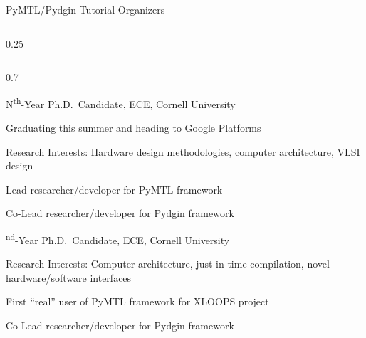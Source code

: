 \begin{frame}{PyMTL/Pydgin Tutorial Organizers}
\begin{cbxcols}

  \begin{column}{0.25\tw}


    \medskip

  \end{column}

  \begin{column}{0.7\tw}
  \cbxlistfontsize{\footnotesize}{\footnotesize}


  \vspace{0.1in}\hspace*{0.5em}%
  \begin{cbxlist}[t]

    \1 N\textsuperscript{th}-Year Ph.D.~Candidate, ECE, Cornell University

    \vspace{0.02in}
    \1 Graduating this summer and heading to Google Platforms

    \vspace{0.02in}
    \1 Research Interests: Hardware design methodologies, computer
       architecture, VLSI design

    \vspace{0.02in}
    \1 Lead researcher/developer for PyMTL framework

    \vspace{0.02in}
    \1 Co-Lead researcher/developer for Pydgin framework

  \end{cbxlist}

  \medskip

  \vspace{0.1in}\hspace*{0.5em}%
  \begin{cbxlist}[t]

    \textsuperscript{nd}-Year Ph.D.~Candidate, ECE, Cornell University

    \vspace{0.02in}
    \1 Research Interests: Computer architecture, just-in-time
          compilation, novel hardware/software interfaces

    \vspace{0.02in}
    \1 First ``real'' user of PyMTL framework for XLOOPS project

    \vspace{0.02in}
    \1 Co-Lead researcher/developer for Pydgin framework

  \end{cbxlist}

  \cbxlistfontsizereset{}
  \end{column}

\end{cbxcols}
\end{frame}


